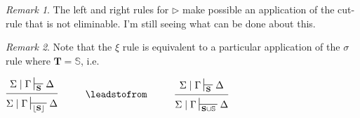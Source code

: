 \documentclass{article}                     %
\theoremstyle{theorem}
\theoremstyle{corollary}
\theoremstyle{lemma}
\theoremstyle{definition}
\theoremstyle{remark}
\newtheorem{remark}{Remark}
\theoremstyle{definition}
\theoremstyle{notation}
\theoremstyle{definition}
\theoremstyle{proposition}
\theoremstyle{definition}
\begin{document}
\begin{remark}
 The left and right rules for $ \rhd $ make possible an application of the cut-rule that is not eliminable. I'm still seeing what can be done about this.
\end{remark}


\begin{remark}

 Note that the $ \xi $ rule is equivalent to a particular application of the $ \sigma $ rule where $ \mathbf{T} = \mathbb{S} $, i.e.
 
 \vspace{3mm}
 
 $
 \begin{prooftree}
 	\Hypo{\Sigma\mid\Gamma\sststile{\mathbf{S}}{}\Delta}
 	\Infer1[]{ \Sigma\mid\Gamma\sststile{\lfloor\mathbf{S}\rfloor}{} \Delta}
 \end{prooftree}
 \hspace{1cm} \leadstofrom \hspace{1cm}
 \begin{prooftree}
 	\Hypo{\Sigma\mid\Gamma\sststile{\mathbf{S}}{}\Delta}
 	\Infer1[]{ \Sigma\mid\Gamma\sststile{\mathbf{S}\cup\mathbb{S}}{} \Delta}
 \end{prooftree}
 $
\end{remark}

 \vspace{3mm}

\end{document}
